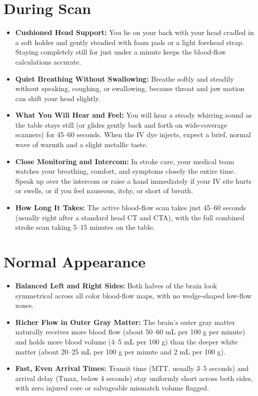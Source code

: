 \section{During Scan}
\begin{itemize}
    \item \textbf{Cushioned Head Support:} You lie on your back with your head cradled in a soft holder and gently steadied with foam pads or a light forehead strap. Staying completely still for just under a minute keeps the blood-flow calculations accurate.
    \item \textbf{Quiet Breathing Without Swallowing:} Breathe softly and steadily without speaking, coughing, or swallowing, because throat and jaw motion can shift your head slightly.
    \item \textbf{What You Will Hear and Feel:} You will hear a steady whirring sound as the table stays still (or glides gently back and forth on wide-coverage scanners) for 45--60 seconds. When the IV dye injects, expect a brief, normal wave of warmth and a slight metallic taste.
    \item \textbf{Close Monitoring and Intercom:} In stroke care, your medical team watches your breathing, comfort, and symptoms closely the entire time. Speak up over the intercom or raise a hand immediately if your IV site hurts or swells, or if you feel nauseous, itchy, or short of breath.
    \item \textbf{How Long It Takes:} The active blood-flow scan takes just 45--60 seconds (usually right after a standard head CT and CTA), with the full combined stroke scan taking 5--15 minutes on the table.
\end{itemize}

\section{Normal Appearance}
\begin{itemize}
    \item \textbf{Balanced Left and Right Sides:} Both halves of the brain look symmetrical across all color blood-flow maps, with no wedge-shaped low-flow zones.
    \item \textbf{Richer Flow in Outer Gray Matter:} The brain's outer gray matter naturally receives more blood flow (about 50--60 mL per 100 g per minute) and holds more blood volume (4--5 mL per 100 g) than the deeper white matter (about 20--25 mL per 100 g per minute and 2 mL per 100 g).
    \item \textbf{Fast, Even Arrival Times:} Transit time (MTT, usually 3--5 seconds) and arrival delay (Tmax, below 4 seconds) stay uniformly short across both sides, with zero injured core or salvageable mismatch volume flagged.
\end{itemize}

